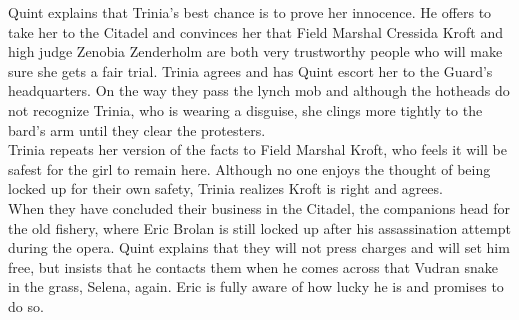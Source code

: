 Quint explains that Trinia's best chance is to prove her innocence. He offers to take her to the Citadel and convinces her that Field Marshal Cressida Kroft and high judge Zenobia Zenderholm are both very trustworthy people who will make sure she gets a fair trial. Trinia agrees and has Quint escort her to the Guard's headquarters. On the way they pass the lynch mob and although the hotheads do not recognize Trinia, who is wearing a disguise, she clings more tightly to the bard's arm until they clear the protesters.\\

Trinia repeats her version of the facts to Field Marshal Kroft, who feels it will be safest for the girl to remain here. Although no one enjoys the thought of being locked up for their own safety, Trinia realizes Kroft is right and agrees.\\

When they have concluded their business in the Citadel, the companions head for the old fishery, where Eric Brolan is still locked up after his assassination attempt during the opera. Quint explains that they will not press charges and will set him free, but insists that he contacts them when he comes across that Vudran snake in the grass, Selena, again. Eric is fully aware of how lucky he is and promises to do so.\\

